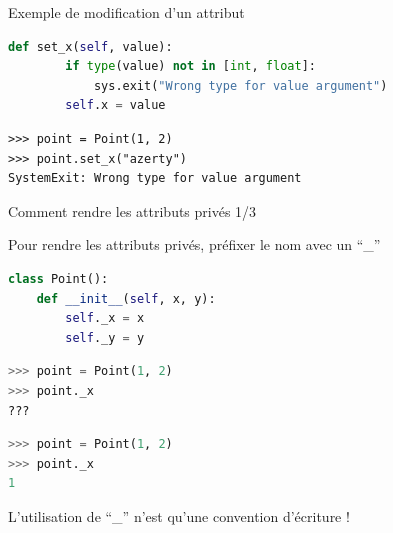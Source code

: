 \documentclass[10pt]{beamer}
\begin{document}
\begin{frame}[fragile]{Exemple de modification d'un attribut}
\begin{overprint}
\begin{lstlisting}[language=Python, numbers=none]
    def set_x(self, value):
        if type(value) not in [int, float]:
            sys.exit("Wrong type for value argument")
        self.x = value
\end{lstlisting}

\begin{lstlisting}[numbers=none]
>>> point = Point(1, 2)
>>> point.set_x("azerty")
SystemExit: Wrong type for value argument
\end{lstlisting}


\end{overprint}

\end{frame}



\begin{frame}[fragile]{Comment rendre les attributs privés 1/3}

  Pour rendre les attributs privés, préfixer le nom avec un ``\_''

\begin{lstlisting}[language=Python, numbers=none]
class Point():
    def __init__(self, x, y):
        self._x = x
        self._y = y
\end{lstlisting}

\begin{overprint}

\begin{lstlisting}[language=Python, numbers=none]
>>> point = Point(1, 2)
>>> point._x
???
\end{lstlisting}

\begin{lstlisting}[language=Python, numbers=none]
>>> point = Point(1, 2)
>>> point._x
1
\end{lstlisting}
L'utilisation de ``\_'' n'est qu'une convention d'écriture !

\end{overprint}

  \end{frame}
\end{document}
